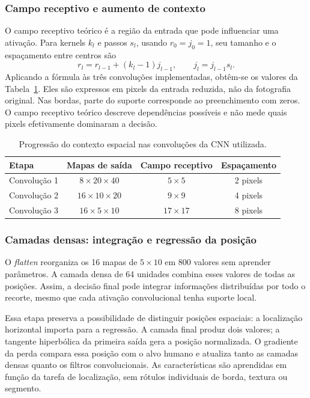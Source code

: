 \documentclass[a4paper,oneside,11pt]{article}
\begin{document}
\subsubsection{Campo receptivo e aumento de contexto}
O campo receptivo teórico é a região da entrada que pode influenciar uma ativação. Para kernels $k_l$ e passos $s_l$, usando $r_0=j_0=1$, seu tamanho e o espaçamento entre centros são
\begin{equation}
 r_l=r_{l-1}+(k_l-1)j_{l-1},\qquad
 j_l=j_{l-1}s_l.
\end{equation}
Aplicando a fórmula às três convoluções implementadas, obtêm-se os valores da Tabela~\ref{tab:campo-receptivo}. Eles são expressos em pixels da entrada reduzida, não da fotografia original. Nas bordas, parte do suporte corresponde ao preenchimento com zeros. O campo receptivo teórico descreve dependências possíveis e não mede quais pixels efetivamente dominaram a decisão.
\begin{table}[htbp]\centering
\caption{Progressão do contexto espacial nas convoluções da CNN utilizada.}
\label{tab:campo-receptivo}
\begin{tabular}{lccc}\toprule
Etapa & Mapas de saída & Campo receptivo & Espaçamento\\\midrule
Convolução 1 & $8\times20\times40$ & $5\times5$ & 2 pixels\\
Convolução 2 & $16\times10\times20$ & $9\times9$ & 4 pixels\\
Convolução 3 & $16\times5\times10$ & $17\times17$ & 8 pixels\\\bottomrule
\end{tabular}
\end{table}

\subsubsection{Camadas densas: integração e regressão da posição}
O \textit{flatten} reorganiza os 16 mapas de $5\times10$ em 800 valores sem aprender parâmetros. A camada densa de 64 unidades combina esses valores de todas as posições. Assim, a decisão final pode integrar informações distribuídas por todo o recorte, mesmo que cada ativação convolucional tenha suporte local.

Essa etapa preserva a possibilidade de distinguir posições espaciais: a localização horizontal importa para a regressão. A camada final produz dois valores; a tangente hiperbólica da primeira saída gera a posição normalizada. O gradiente da perda compara essa posição com o alvo humano e atualiza tanto as camadas densas quanto os filtros convolucionais. As características são aprendidas em função da tarefa de localização, sem rótulos individuais de borda, textura ou segmento.
\end{document}
